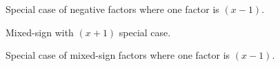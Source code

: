 \documentclass[12pt, a4paper, addpoints]{exam}
\newcommand{\ts}{\vspace{22 mm}}
\newcommand{\ms}{\vspace{33 mm}}
\begin{document}
\begin{questions}
\ts

\question Special  case  of negative factors where one factor is \((x-1) \). 

\begin{multicols}{3}
\end{multicols}
\ts


\question Mixed-sign  with  \((x+1) \) special case. 
\begin{multicols}{3}
\end{multicols}
\ts

\question Special  case  of mixed-sign  factors where one factor is \((x-1) \). 
\begin{multicols}{3}
\end{multicols}
\ts





\end{questions}
\end{document}
